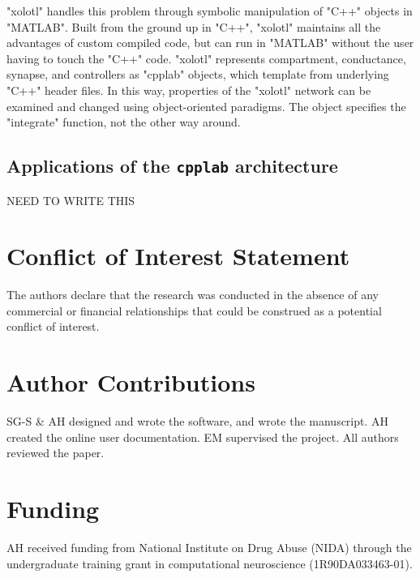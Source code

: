 \documentclass{frontiersSCNS} %
\begin{document}
"xolotl" handles this problem through symbolic manipulation of "C++" objects in "MATLAB". Built from the ground up in "C++", "xolotl" maintains all the advantages of custom compiled code, but can run in "MATLAB" without the user having to touch the "C++" code. "xolotl" represents compartment, conductance, synapse, and controllers as "cpplab" objects, which template from underlying "C++" header files. In this way, properties of the "xolotl" network can be examined and changed using object-oriented paradigms. The object specifies the "integrate" function, not the other way around.

\subsection{Applications of the \texttt{cpplab} architecture}

NEED TO WRITE THIS




%
%
%
%
%
%

\section*{Conflict of Interest Statement}

The authors declare that the research was conducted in the absence of any commercial or financial relationships that could be construed as a potential conflict of interest.

\section*{Author Contributions}

SG-S \& AH designed and wrote the software, and wrote the manuscript. AH created the online user documentation. EM supervised the project. All authors reviewed the paper.

\section*{Funding}

AH received funding from National Institute on Drug Abuse (NIDA) through the undergraduate training grant in computational neuroscience (1R90DA033463-01).
\end{document}
